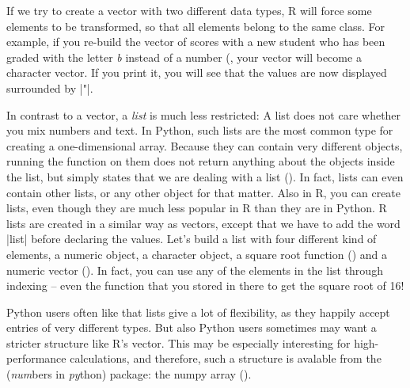 If we try to
create a vector with two different data types, R will 
force some elements to be transformed, so that all elements belong to the same
class. For example, if you re-build the vector of scores with a new student who has
been graded with the letter \emph{b} instead of a number (, your vector
will become a character vector. If you print it, you will see that the
values are now displayed surrounded by |"|.




In contrast to a vector, a \emph{list} is much less restricted: A list does not care
whether you mix numbers and text. In Python, such lists are the most common type for creating
a one-dimensional array. Because they
can contain very different objects, running the  function on them
does not return anything about the objects inside the list, but simply states that we
are dealing with a list ().
In fact, lists can even contain other lists, or any other object for
that matter. 
Also in R, you can create lists, even though they are much less popular in R than
they are in Python. R lists are created in a similar way as vectors, except that we have to add the word |list|
before declaring the values. Let's build a list with four different
kind of elements, a numeric object, a character object, a square root
function () and a numeric vector (). In fact, you
can use any of the elements in the list through indexing -- even the
function  that you stored in there to get the square root of
16!


Python users often like that lists give  a lot of flexibility, as they happily accept
entries of very different types. But also Python users sometimes may want a stricter
structure like R's vector. This may be especially interesting for
high-performance calculations, and therefore, such a structure is
avalable from the  (\emph{num}bers in \emph{py}thon)
package: the numpy array ().




